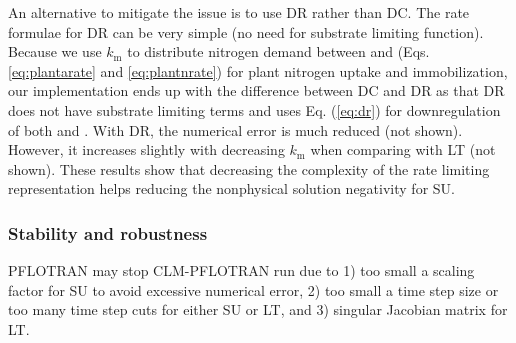 \documentclass[gmd, manuscript]{copernicus}
\begin{document}
An alternative to mitigate the issue is to use DR rather than DC. The rate
formulae for DR can be very simple (no need for substrate limiting function).
Because we use $k_\text{m}$ to distribute nitrogen demand between 
and  (Eqs. \ref{eq:plantarate} and \ref{eq:plantnrate}) for plant
nitrogen uptake and immobilization, our implementation ends up with the
difference between DC and DR as that DR does not have  substrate
limiting terms and uses Eq. (\ref{eq:dr}) for downregulation of both
 and . With DR, the numerical error is much reduced
(not shown). However, it increases
slightly with decreasing $k_\text{m}$ when comparing with LT (not shown). These
results show that decreasing the complexity of the rate limiting representation
helps reducing the nonphysical solution negativity for SU.



   
\subsubsection{Stability and robustness}
PFLOTRAN may stop CLM-PFLOTRAN run due to  1) too small a scaling factor for SU
to avoid excessive numerical error, 2) too small a time step size or too many
time step cuts for either SU or LT, and 3) singular Jacobian matrix for LT. 
\end{document}

